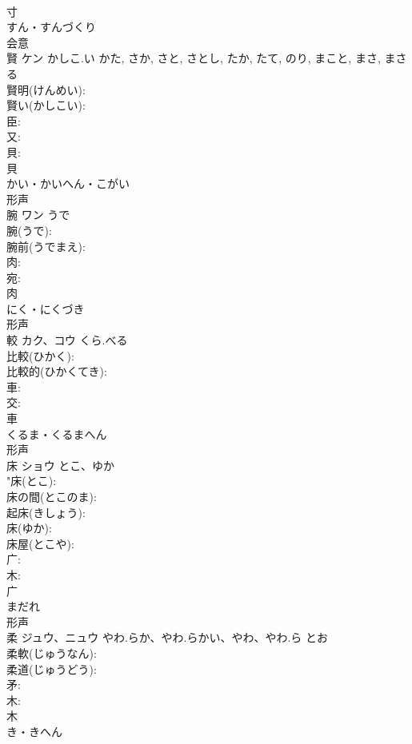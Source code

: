 \documentclass[8pt]{extreport}
\begin{document}
\begin{CJK}{UTF8}{min}
\\	寸	
\\	すん・すんづくり	
\\	会意 
\\	賢	ケン	かしこ.い	かた, さか, さと, さとし, たか, たて, のり, まこと, まさ, まさる	
\\	賢明(けんめい): 
\\	賢い(かしこい): 
\\	臣: 
\\	又: 
\\	貝: 
\\	貝	
\\	かい・かいへん・こがい	
\\	形声 
\\	腕	ワン	うで		
\\	腕(うで): 
\\	腕前(うでまえ): 
\\	肉: 
\\	宛: 
\\	肉	
\\	にく・にくづき	
\\	形声 
\\	較	カク、コウ	くら.べる		
\\	比較(ひかく): 
\\	比較的(ひかくてき): 
\\	車: 
\\	交: 
\\	車	
\\	くるま・くるまへん	
\\	形声 
\\	床	ショウ	とこ、ゆか		
\\	"床(とこ): 
\\	床の間(とこのま): 
\\	起床(きしょう): 
\\	床(ゆか): 
\\	床屋(とこや): 
\\	广: 
\\	木: 
\\	广	
\\	まだれ	
\\	形声 
\\	柔	ジュウ、ニュウ	やわ.らか、やわ.らかい、やわ、やわ.ら	とお	
\\	柔軟(じゅうなん): 
\\	柔道(じゅうどう): 
\\	矛: 
\\	木: 
\\	木	
\\	き・きへん	

\end{CJK}
\end{document}
